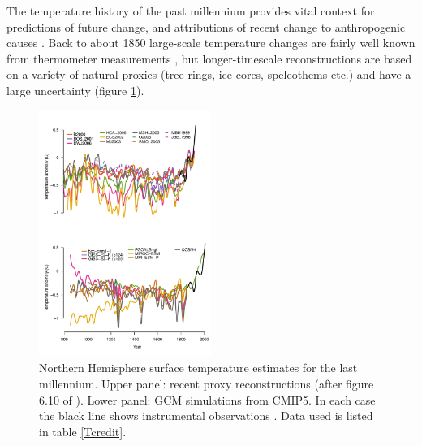 \documentclass[CP]{copernicus}
\begin{document}
The temperature history of the past millennium provides vital context for predictions of future change, and attributions of recent change to anthropogenic causes \citep{jones04millennia}. Back to about 1850 large-scale temperature changes are fairly well known from thermometer measurements \citep{brohan06hadcrut3}, but longer-timescale reconstructions are based on a variety of natural proxies (tree-rings, ice cores, speleothems etc.) and have a large uncertainty (figure \ref{Fml1}).
\begin{figure}[!hbp]
\begin{center}
\includegraphics[angle=0, width=0.5\textwidth]{fig1.pdf}
\caption{Northern Hemisphere surface temperature estimates for the last millennium. Upper panel: recent proxy reconstructions (after figure 6.10 of \citet{jansen07ipcc}). Lower panel: GCM simulations from CMIP5. In each case the black line shows instrumental observations \citep{brohan06hadcrut3}. Data used is listed in table \ref{Tcredit}.}
\label{Fml1}
\end{center}
\end{figure}
\end{document}
